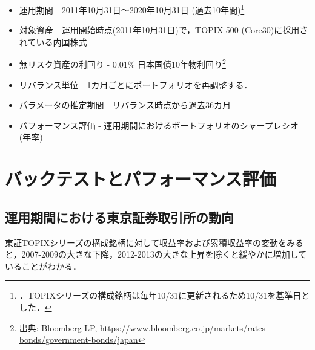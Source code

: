 \documentclass[dvipdfmx,autodetect-engine]{jsarticle}
\begin{document}
\begin{itemize}
    \item 運用期間 \hspace{0.05em} - \hspace{0.05em} 
    2011年10月31日～2020年10月31日 (過去10年間)\footnote{．TOPIXシリーズの構成銘柄は毎年10/31に更新されるため10/31を基準日とした．}
    \item 対象資産 \hspace{0.05em} - \hspace{0.05em} 
    運用開始時点(2011年10月31日)で，TOPIX 500 (Core30)に採用されている内国株式
    \item 無リスク資産の利回り \hspace{0.05em} - \hspace{0.05em} 
    0.01\% 日本国債10年物利回り\footnote{出典: Bloomberg LP, \url{https://www.bloomberg.co.jp/markets/rates-bonds/government-bonds/japan}}
    \item リバランス単位 \hspace{0.05em} - \hspace{0.05em} 
    1カ月ごとにポートフォリオを再調整する．
    \item パラメータの推定期間 \hspace{0.05em} - \hspace{0.05em} 
    リバランス時点から過去36カ月
    \item パフォーマンス評価 \hspace{0.05em} - \hspace{0.05em} 
    運用期間におけるポートフォリオのシャープレシオ(年率)
\end{itemize}

\section{バックテストとパフォーマンス評価}

\subsection{運用期間における東京証券取引所の動向}

東証TOPIXシリーズの構成銘柄に対して収益率および累積収益率の変動をみると，2007-2009の大きな下降，2012-2013の大きな上昇を除くと緩やかに増加していることがわかる．
\end{document}

